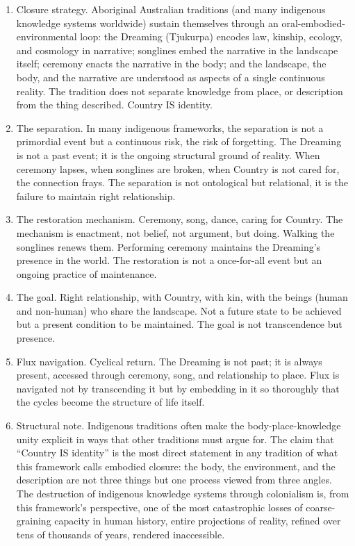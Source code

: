 \documentclass[
]{article}
\begin{document}
\begin{enumerate}
\def\labelenumi{\arabic{enumi}.}
\setcounter{enumi}{53}
\item
  Closure strategy. Aboriginal Australian traditions (and many
  indigenous knowledge systems worldwide) sustain themselves through an
  oral-embodied-environmental loop: the Dreaming (Tjukurpa) encodes law,
  kinship, ecology, and cosmology in narrative; songlines embed the
  narrative in the landscape itself; ceremony enacts the narrative in
  the body; and the landscape, the body, and the narrative are
  understood as aspects of a single continuous reality. The tradition
  does not separate knowledge from place, or description from the thing
  described. Country IS identity.
\item
  The separation. In many indigenous frameworks, the separation is not a
  primordial event but a continuous risk, the risk of forgetting. The
  Dreaming is not a past event; it is the ongoing structural ground of
  reality. When ceremony lapses, when songlines are broken, when Country
  is not cared for, the connection frays. The separation is not
  ontological but relational, it is the failure to maintain right
  relationship.
\item
  The restoration mechanism. Ceremony, song, dance, caring for Country.
  The mechanism is enactment, not belief, not argument, but doing.
  Walking the songlines renews them. Performing ceremony maintains the
  Dreaming's presence in the world. The restoration is not a
  once-for-all event but an ongoing practice of maintenance.
\item
  The goal. Right relationship, with Country, with kin, with the beings
  (human and non-human) who share the landscape. Not a future state to
  be achieved but a present condition to be maintained. The goal is not
  transcendence but presence.
\item
  Flux navigation. Cyclical return. The Dreaming is not past; it is
  always present, accessed through ceremony, song, and relationship to
  place. Flux is navigated not by transcending it but by embedding in it
  so thoroughly that the cycles become the structure of life itself.
\item
  Structural note. Indigenous traditions often make the
  body-place-knowledge unity explicit in ways that other traditions must
  argue for. The claim that ``Country IS identity'' is the most direct
  statement in any tradition of what this framework calls embodied
  closure: the body, the environment, and the description are not three
  things but one process viewed from three angles. The destruction of
  indigenous knowledge systems through colonialism is, from this
  framework's perspective, one of the most catastrophic losses of
  coarse-graining capacity in human history, entire projections of
  reality, refined over tens of thousands of years, rendered
  inaccessible.
\end{enumerate}
\end{document}
